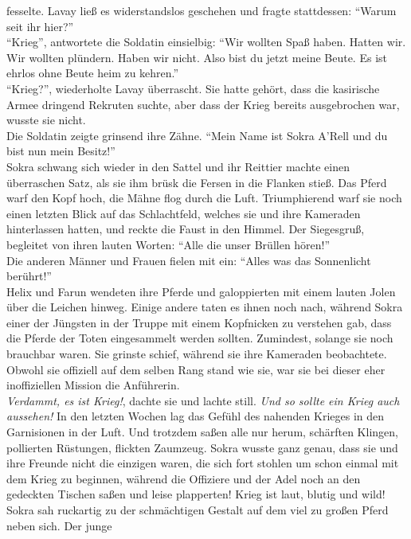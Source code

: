 fesselte. Lavay ließ es widerstandslos geschehen und fragte stattdessen: ``Warum seit ihr hier?''\\
``Krieg'', antwortete die Soldatin einsielbig: ``Wir wollten Spaß haben. Hatten wir. Wir wollten 
plündern. Haben wir nicht. Also bist du jetzt meine Beute. Es ist ehrlos ohne Beute heim zu 
kehren.''\\
``Krieg?'', wiederholte Lavay überrascht. Sie hatte gehört, dass die kasirische Armee dringend 
Rekruten suchte, aber dass der Krieg bereits ausgebrochen war, wusste sie nicht.\\
Die Soldatin zeigte grinsend ihre Zähne. ``Mein Name ist Sokra A'Rell und du bist nun mein 
Besitz!''\\

Sokra schwang sich wieder in den Sattel und ihr Reittier machte einen überraschen Satz, als sie ihm 
brüsk die Fersen in die Flanken stieß. Das Pferd warf den Kopf hoch, die Mähne flog durch die Luft. 
Triumphierend warf sie noch einen letzten Blick auf das Schlachtfeld, welches sie und ihre 
Kameraden hinterlassen hatten, und reckte die Faust in den Himmel. Der Siegesgruß, begleitet von 
ihren lauten Worten: ``Alle die unser Brüllen hören!''\\
Die anderen Männer und Frauen fielen mit ein: ``Alles was das Sonnenlicht berührt!''\\
Helix und Farun wendeten ihre Pferde und galoppierten mit einem lauten Jolen über die Leichen 
hinweg. Einige andere taten es ihnen noch nach, während Sokra einer der Jüngsten in der Truppe mit 
einem Kopfnicken zu verstehen gab, dass die Pferde der Toten eingesammelt werden sollten. 
Zumindest, solange sie noch brauchbar waren. Sie grinste schief, während sie ihre Kameraden 
beobachtete. Obwohl sie offiziell auf dem selben Rang stand wie sie, war sie bei dieser eher 
inoffiziellen Mission die Anführerin.\\
\textit{Verdammt, es ist Krieg!}, dachte sie und lachte still. \textit{Und so sollte ein Krieg auch 
aussehen!}
In den letzten Wochen lag das Gefühl des nahenden Krieges in den Garnisionen in der Luft. Und 
trotzdem saßen alle nur herum, schärften Klingen, pollierten Rüstungen, flickten Zaumzeug. Sokra 
wusste ganz genau, dass sie und ihre Freunde nicht die einzigen waren, die sich fort stohlen um 
schon einmal mit dem Krieg zu beginnen, während die Offiziere und der Adel noch an den gedeckten 
Tischen saßen und leise plapperten! Krieg ist laut, blutig und wild!\\
Sokra sah ruckartig zu der schmächtigen Gestalt auf dem viel zu großen Pferd neben sich. Der junge 
